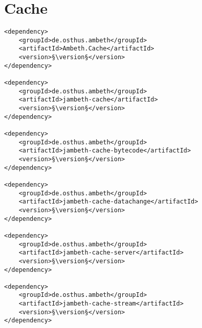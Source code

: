 \section{Cache}
\label{module:Cache}
\ClearAPI
\TODO
\begin{lstlisting}[style=POM,caption={Maven modules to use \emph{Ambeth Cache}}]
<dependency>
	<groupId>de.osthus.ambeth</groupId>
	<artifactId>Ambeth.Cache</artifactId>
	<version>§\version§</version>
</dependency>

<dependency>
	<groupId>de.osthus.ambeth</groupId>
	<artifactId>jambeth-cache</artifactId>
	<version>§\version§</version>
</dependency>

<dependency>
	<groupId>de.osthus.ambeth</groupId>
	<artifactId>jambeth-cache-bytecode</artifactId>
	<version>§\version§</version>
</dependency>

<dependency>
	<groupId>de.osthus.ambeth</groupId>
	<artifactId>jambeth-cache-datachange</artifactId>
	<version>§\version§</version>
</dependency>

<dependency>
	<groupId>de.osthus.ambeth</groupId>
	<artifactId>jambeth-cache-server</artifactId>
	<version>§\version§</version>
</dependency>

<dependency>
	<groupId>de.osthus.ambeth</groupId>
	<artifactId>jambeth-cache-stream</artifactId>
	<version>§\version§</version>
</dependency>
\end{lstlisting}
